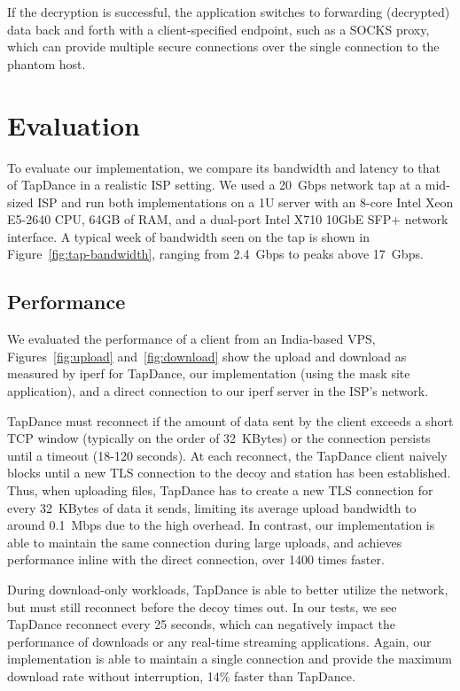 \documentclass[sigconf]{acmart}
\newcommand{\TODO}[1]{}
\renewcommand{\TODO}[1]{{\color{red} TODO: {#1}}}
\begin{document}
\FigTapBandwidth

If the decryption is successful, the application switches to forwarding
(decrypted) data back and forth with a client-specified endpoint, such as a
SOCKS proxy, which can provide multiple secure connections over the single
connection to the phantom host.


\section{Evaluation}
\label{sec:evaluation}


\FigUpload
\FigDownload

To evaluate our \scheme implementation, we compare its bandwidth and latency
to that of TapDance in a realistic ISP setting. We used a 20~Gbps
network tap at a mid-sized ISP and run both implementations on a 1U server with
an 8-core Intel Xeon E5-2640 CPU, 64GB of RAM, and a dual-port Intel X710 10GbE SFP+
network interface. A typical week of bandwidth seen on the tap is
shown in Figure~\ref{fig:tap-bandwidth}, ranging from 2.4~Gbps to peaks above
17~Gbps.

\subsection{Performance}

We evaluated the performance of a client from an India-based VPS,
Figures~\ref{fig:upload} and~\ref{fig:download} show the upload and download as
measured by iperf for TapDance, our \scheme implementation (using the mask site application),
and a direct connection to our iperf server in the ISP's network.

TapDance must reconnect if the amount of data sent by the client
exceeds a short TCP window (typically on the order of 32~KBytes) or the
connection persists until a timeout (18-120 seconds). At each reconnect, the
TapDance client naively blocks until a new TLS connection to the decoy and
station has been established. Thus, when uploading files, TapDance has to create
a new TLS connection for every 32~KBytes of data it sends, limiting its average
upload bandwidth to around 0.1~Mbps due to the high overhead. In contrast,
our \scheme implementation is
able to maintain the same connection during large uploads, and achieves
performance inline with the direct connection, over 1400 times faster.

During download-only workloads, TapDance is able to better utilize the network,
but must still reconnect before the decoy times out. In our tests, we see
TapDance reconnect every 25 seconds, which can negatively impact the performance of
downloads or any real-time streaming applications. Again, our \scheme
implementation is able to maintain a single connection and provide the maximum
download rate without interruption, 14\% faster than TapDance.
\end{document}

